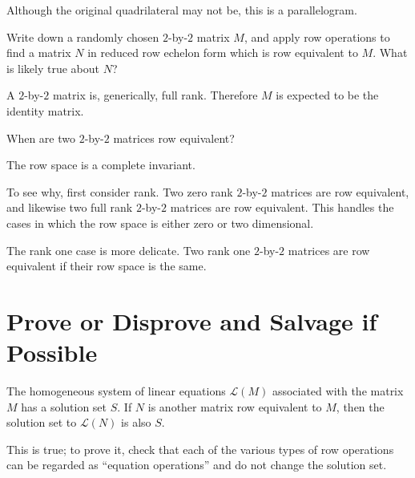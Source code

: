 \documentclass{homework}
\begin{document}
\begin{solution}
  Although the original quadrilateral may not be, this is a
  parallelogram.
\end{solution}

\begin{problem}
  Write down a randomly chosen $2$-by-$2$ matrix $M$, and apply row
  operations to find a matrix $N$ in reduced row echelon form which is row
  equivalent to $M$.  What is likely true about $N$?
\end{problem}

\begin{solution}
  A $2$-by-$2$ matrix is, generically, full rank.  Therefore $M$ is
  expected to be the identity matrix.
\end{solution}

\begin{problem}
  When are two $2$-by-$2$ matrices row equivalent?
\end{problem}

\begin{solution}
  The row space is a complete invariant.  
  
  To see why, first consider rank.  Two zero rank $2$-by-$2$ matrices
  are row equivalent, and likewise two full rank $2$-by-$2$ matrices
  are row equivalent.  This handles the cases in which the row space
  is either zero or two dimensional.

  The rank one case is more delicate.  Two rank one $2$-by-$2$
  matrices are row equivalent if their row space is the same.
\end{solution}

\section{Prove or Disprove and Salvage if Possible}

\begin{problem}
  The homogeneous system of linear equations $\mathcal{L}(M)$
  associated with the matrix $M$ has a solution set $S$.  If $N$ is
  another matrix row equivalent to $M$, then the solution set to
  $\mathcal{L}(N)$ is also $S$.
\end{problem}

\begin{solution}
  This is true; to prove it, check that each of the various types of
  row operations can be regarded as ``equation operations'' and do not
  change the solution set.
\end{solution}
\end{document}
